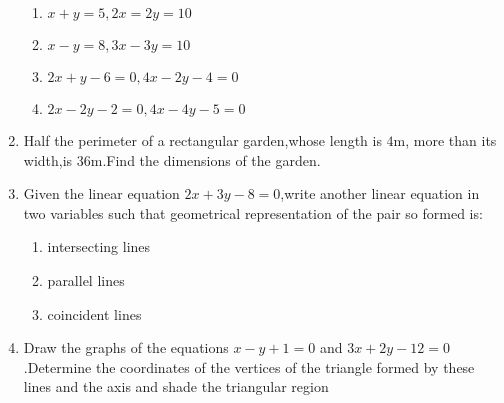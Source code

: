 \documentclass{article}
\theoremstyle{remark}
\begin{document}
\begin{enumerate}
\begin {enumerate}[label=(\roman*)]
\item $x+y=5,2x=2y=10$
\item $x-y=8,3x-3y=10$
\item $2x+y-6=0,4x-2y-4=0$
\item $2x-2y-2=0,4x-4y-5=0$
\end{enumerate}
\item Half the perimeter of a rectangular garden,whose length is $4$m, more than its width,is $36$m.Find the dimensions of the garden.
\item Given the linear equation $2x+3y-8=0$,write another linear equation in two variables such that geometrical representation of the pair so formed is:
\begin{enumerate}[label=(\roman*)]
\item intersecting lines
\item parallel lines
\item coincident lines
\end{enumerate}
\item Draw the graphs of the equations $x-y+1=0$ and $3x+2y-12=0$.Determine the coordinates of the vertices of the triangle formed by these lines and the axis and shade the triangular region
\end{enumerate}
\end{document}
